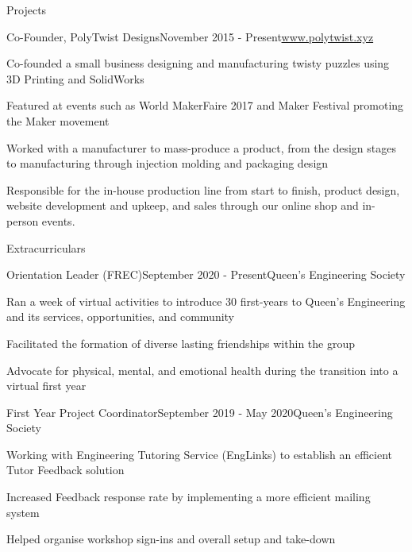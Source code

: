 \documentclass{resume} %
\begin{document}
\begin{rSection}{Projects}

\begin{rSubsection}{Co-Founder, PolyTwist Designs}{November 2015 - Present}{\url{www.polytwist.xyz}}{}
\item Co-founded a small business designing and manufacturing twisty puzzles using 3D Printing and SolidWorks
\item Featured at events such as World MakerFaire 2017 and Maker Festival promoting the Maker movement
\item Worked with a manufacturer to mass-produce a product, from the design stages to manufacturing through injection molding and packaging design
\item Responsible for the in-house production line from start to finish, product design, website development and upkeep, and sales through our online shop and in-person events.
\end{rSubsection}

\end{rSection}


\begin{rSection}{Extracurriculars}
  
\begin{rSubsection}{Orientation Leader (FREC)}{September 2020 - Present}{Queen's Engineering Society}{}
\item Ran a week of virtual activities to introduce 30 first-years to Queen's Engineering and its services, opportunities, and community
\item Facilitated the formation of diverse lasting friendships within the group
\item Advocate for physical, mental, and emotional health during the transition into a virtual first year
\end{rSubsection}

\begin{rSubsection}{First Year Project Coordinator}{September 2019 - May 2020}{Queen's Engineering Society}{}
\item Working with Engineering Tutoring Service (EngLinks) to establish an efficient Tutor Feedback solution
\item Increased Feedback response rate by implementing a more efficient mailing system
\item Helped organise workshop sign-ins and overall setup and take-down
\end{rSubsection}

\end{rSection}
\end{document}
